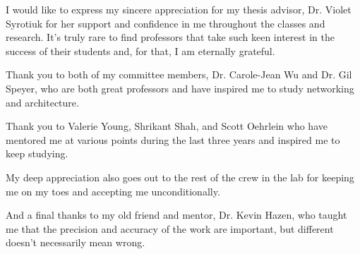 I would like to express my sincere appreciation for my thesis advisor, Dr. Violet Syrotiuk for her support and confidence in me throughout the classes and research.
It's truly rare to find professors that take such keen interest in the success of their students and, for that, I am eternally grateful.

Thank you to both of my committee members, Dr. Carole-Jean Wu and Dr. Gil Speyer, who are both great professors and have inspired me to study networking and architecture. 

Thank you to Valerie Young, Shrikant Shah, and Scott Oehrlein who have mentored me at various points during the last three years and inspired me to keep studying.

My deep appreciation also goes out to the rest of the crew in the lab for keeping me on my toes and accepting me unconditionally.

And a final thanks to my old friend and mentor, Dr. Kevin Hazen, who taught me that the precision and accuracy of the work are important, but different doesn't necessarily mean wrong.

